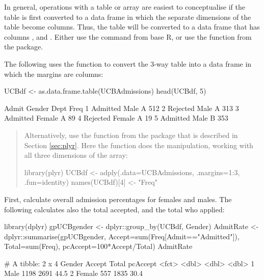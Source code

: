 In general, operations with a table or array are easiest to
conceptualise if the table is first converted to a data frame
in which the separate dimensions of the table become columns.
Thus, the  table will be converted to
a data frame that has columns ,  and
. Either use the 
command from base R, or use the  function from
the  package.

The following uses the function  to convert
the 3-way table  into a data frame in which the
margins are columns:
\begin{Schunk}
\begin{Sinput}
UCBdf <- as.data.frame.table(UCBAdmissions)
head(UCBdf, 5)
\end{Sinput}
\begin{Soutput}
     Admit Gender Dept Freq
1 Admitted   Male    A  512
2 Rejected   Male    A  313
3 Admitted Female    A   89
4 Rejected Female    A   19
5 Admitted   Male    B  353
\end{Soutput}
\end{Schunk}
\begin{quote}
{\small
Alternatively, use the function 
  from the  package that is described in Section
  \ref{sec:plyr}. Here the  function does the
manipulation, working with all three dimensions of the array:
\begin{Schunk}
\begin{Sinput}
library(plyr)
UCBdf <- adply(.data=UCBAdmissions,
               .margins=1:3,
               .fun=identity)
names(UCBdf)[4] <- "Freq"
\end{Sinput}
\end{Schunk}
}
\end{quote}
First, calculate overall admission percentages for
females and males. The following calculates also the total accepted,
and the total who applied:
\begin{fullwidth}

\begin{Schunk}
\begin{Sinput}
library(dplyr)
gpUCBgender <- dplyr::group_by(UCBdf, Gender)
AdmitRate <- dplyr::summarise(gpUCBgender,
                              Accept=sum(Freq[Admit=="Admitted"]),
                              Total=sum(Freq),
                              pcAccept=100*Accept/Total)
AdmitRate
\end{Sinput}
\begin{Soutput}
# A tibble: 2 x 4
  Gender Accept Total pcAccept
  <fct>   <dbl> <dbl>    <dbl>
1 Male     1198  2691     44.5
2 Female    557  1835     30.4
\end{Soutput}
\end{Schunk}

\end{fullwidth}

